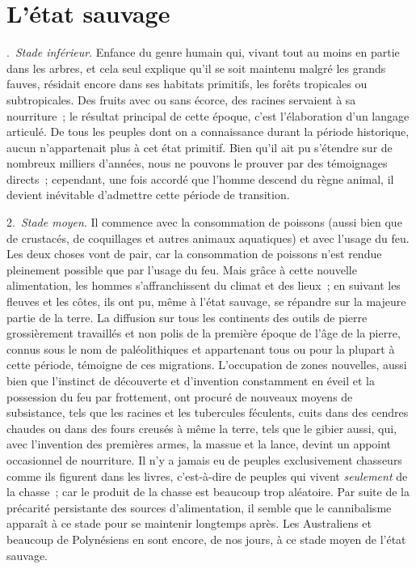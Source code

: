 \documentclass[french,twoside]{book} %
\begin{document}
\section[{L’état sauvage}]{L’état sauvage\protect\footnotemark }\renewcommand{\leftmark}{L’état sauvage}

. \emph{Stade inférieur}. Enfance du genre humain qui, vivant tout au moins en partie dans les arbres, et cela seul explique qu’il se soit maintenu malgré les grands fauves, résidait encore dans ses habitats primitifs, les forêts tropicales ou subtropicales. Des fruits avec ou sans écorce, des racines servaient à sa nourriture ; le résultat principal de cette époque, c’est l’élaboration d’un langage articulé. De tous les peuples dont on a connaissance durant la période historique, aucun n’appartenait plus à cet état primitif. Bien qu’il ait pu s’étendre sur de nombreux milliers d’années, nous ne pouvons le prouver par des témoignages directs ; cependant, une fois accordé que l’homme descend du règne animal, il devient inévitable d’admettre cette période de transition.\par
2. \emph{Stade moyen}. Il commence avec la consommation de poissons (aussi bien que de crustacés, de coquillages et autres animaux aquatiques) et avec l’usage du feu. Les deux choses vont de pair, car la consommation de poissons n’est rendue pleinement possible que par l’usage du feu. Mais grâce à cette nouvelle alimentation, les hommes s’affranchissent du climat et des lieux ; en suivant les fleuves et les côtes, ils ont pu, même à l’état sauvage, se répandre sur la majeure partie de la terre. La diffusion sur tous les continents des outils de pierre grossièrement travaillés et non polis de la première époque de l’âge de la pierre, connus sous le nom de paléolithiques et appartenant tous ou pour la plupart à cette période, témoigne de ces migrations. L’occupation de zones nouvelles, aussi bien que l’instinct de découverte et d’invention constamment en éveil et la possession du feu par frottement, ont procuré de nouveaux moyens de subsistance, tels que les racines et les tubercules féculents, cuits dans des cendres chaudes ou dans des fours creusés à même la terre, tels que le gibier aussi, qui, avec l’invention des premières armes, la massue et la lance, devint un appoint occasionnel de nourriture. Il n’y a jamais eu de peuples exclusivement chasseurs comme ils figurent dans les livres, c’est-à-dire de peuples qui vivent \emph{seulement} de la chasse ; car le produit de la chasse est beaucoup trop aléatoire. Par suite de la précarité persistante des sources d’alimentation, il semble que le cannibalisme apparaît à ce stade pour se maintenir longtemps après. Les Australiens et beaucoup de Polynésiens en sont encore, de nos jours, à ce stade moyen de l’état sauvage.\par
\end{document}
